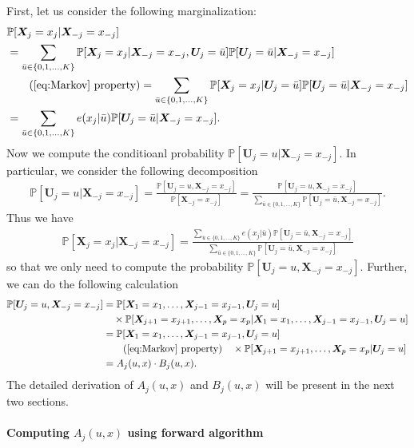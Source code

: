 \documentclass[12pt]{article}
\theoremstyle{definition}
\def\P{\mathbb{P}}
\def\P{\mathbb{P}}
\renewcommand{\P}{\mathbb{P}}							%
\newcommand{\prx}{\bm X}								%
\newcommand{\pru}{{\bm U}}								%
\begin{document}
First, let us consider the following marginalization:
\begin{align*}
	&
	\P[\bm X_j=x_j|\bm X_{-j}=x_{-j}]\\
	&
	=\sum_{\bar u\in \{0,1,\ldots,K\}}\P[\prx_j=x_j|\prx_{-j}=x_{-j},\pru_{j}=\bar u]\P[\pru_j=\bar u|\prx_{-j}=x_{-j}]\\
	&\tag{\ref{eq:Markov} property}
	=\sum_{\bar u\in \{0,1,\ldots,K\}}\P[\bm X_j=x_j|\pru_{j}=\bar u]\P[\pru_j=\bar u|\bm X_{-j}=x_{-j}]\\
	&
	=\sum_{\bar u\in \{0,1,\ldots,K\}}e(x_j|\bar u)\P[\pru_j=\bar u|\bm X_{-j}=x_{-j}].
\end{align*}
Now we compute the conditioanl probability $\P[\pru_j=u|\bm X_{-j}=x_{-j}]$. In particular, we consider the following decomposition
\begin{align*}
	\P[\pru_j=u|\bm X_{-j}=x_{-j}]=\frac{\P[\pru_j=u,\bm X_{-j}=x_{-j}]}{\P[\bm X_{-j}=x_{-j}]}=\frac{\P[\pru_j=u,\bm X_{-j}=x_{-j}]}{\sum_{\bar u\in \{0,1,\ldots,K\}}\P[\pru_j=\bar u,\bm X_{-j}=x_{-j}]}.
\end{align*}
Thus we have 
\begin{align*}
	\P[\bm X_j=x_j|\bm X_{-j}=x_{-j}]=\frac{\sum_{\bar u\in \{0,1,\ldots,K\}}e(x_j|\bar u)\P[\pru_j=\bar u,\bm X_{-j}=x_{-j}]}{\sum_{\bar u\in \{0,1,\ldots,K\}}\P[\pru_j=\bar u,\bm X_{-j}=x_{-j}]}
\end{align*}
so that we only need to compute the probability $\P[\pru_j=u,\bm X_{-j}=x_{-j}]$. Further, we can do the following calculation 
\begin{align*}
	\P[\pru_j=u,\bm X_{-j}=x_{-j}]
	&
	=\P[\bm X_{1}=x_1,\ldots, \prx_{j-1}=x_{j-1},\pru_{j}=u]\\
	&
	\quad\times\P[\prx_{j+1}=x_{j+1},\ldots, \prx_{p}=x_{p}|\prx_{1}=x_1,\ldots, \prx_{j-1}=x_{j-1},\pru_{j}=u]\\
	&
	=\P[\prx_{1}=x_1,\ldots, \prx_{j-1}=x_{j-1},\pru_{j}=u]\\
	&\tag{\ref{eq:Markov} property}
	\quad\times \P[\bm X_{j+1}=x_{j+1},\ldots, \prx_{p}=x_{p}|\pru_{j}=u]\\
	&
	= A_{j}(u,x)\cdot B_j(u,x).
\end{align*}
The detailed derivation of $A_j(u,x)$ and $B_j(u,x)$ will be present in the next two sections.

\paragraph{Computing $A_j(u,x)$ using forward algorithm}
\end{document}
